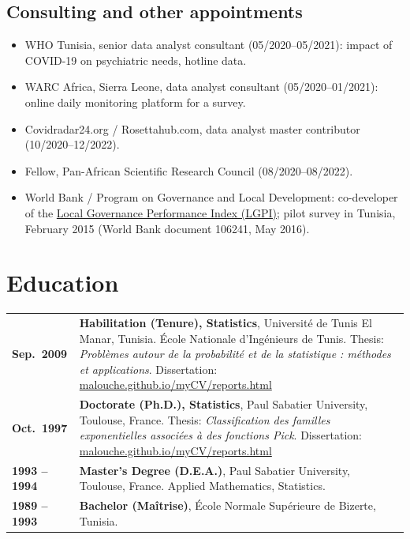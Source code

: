 \documentclass[10pt,a4paper]{article}
\makeatletter
\newenvironment{cvdated}{%
  \begin{longtable}{@{}>{\raggedleft\arraybackslash\bfseries}p{3.35cm}@{\hspace{0.35cm}}p{\dimexpr\textwidth-3.7cm\relax}@{}}}%
  {\end{longtable}\vspace{-10pt}}
\newcommand{\cvrow}[2]{#1 & #2 \\[3pt]}
\makeatother
\begin{document}
\subsection{Consulting and other appointments}
\begin{itemize}
\item WHO Tunisia, senior data analyst consultant (05/2020--05/2021): impact of COVID-19 on psychiatric needs, hotline data.
\item WARC Africa, Sierra Leone, data analyst consultant (05/2020--01/2021): online daily monitoring platform for a survey.
\item Covidradar24.org / Rosettahub.com, data analyst master contributor (10/2020--12/2022).
\item Fellow, Pan-African Scientific Research Council (08/2020--08/2022).
\item World Bank / Program on Governance and Local Development: co-developer of the
      \href{https://documents1.worldbank.org/curated/en/196591468197374514/pdf/106241-WP-P151968-date-May-17-2016-PUBLIC-local-Governance-Performance-Index.pdf}{Local Governance Performance Index (LGPI)};
      pilot survey in Tunisia, February 2015 (World Bank document 106241, May 2016).
\end{itemize}

\section{Education}
\begin{cvdated}
\cvrow{Sep.\ 2009}{\textbf{Habilitation (Tenure), Statistics}, Universit\'e de Tunis El Manar, Tunisia. \'Ecole
Nationale d'Ing\'enieurs de Tunis.\newline
Thesis: \emph{Probl\`emes autour de la probabilit\'e et de la statistique : m\'ethodes et applications}.
Dissertation: \href{https://malouche.github.io/myCV/reports.html}{malouche.github.io/myCV/reports.html}}
\cvrow{Oct.\ 1997}{\textbf{Doctorate (Ph.D.), Statistics}, Paul Sabatier University, Toulouse, France.\newline
Thesis: \emph{Classification des familles exponentielles associ\'ees \`a des fonctions Pick}.
Dissertation: \href{https://malouche.github.io/myCV/reports.html}{malouche.github.io/myCV/reports.html}}
\cvrow{1993 -- 1994}{\textbf{Master's Degree (D.E.A.)}, Paul Sabatier University, Toulouse, France. Applied Mathematics, Statistics.}
\cvrow{1989 -- 1993}{\textbf{Bachelor (Ma\^itrise)}, \'Ecole Normale Sup\'erieure de Bizerte, Tunisia.}
\end{cvdated}
\end{document}
